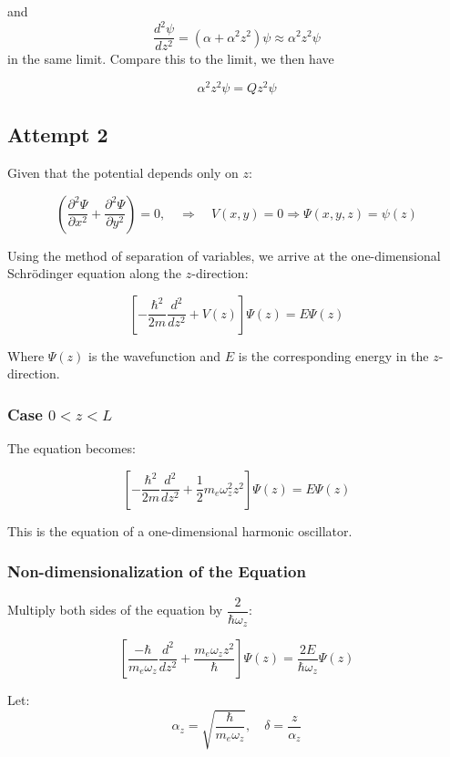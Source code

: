 and \begin{equation}
  \frac{d^2 \psi}{dz^2} = (\alpha + \alpha^2 z^2)\psi \approx \alpha^2 z^2 \psi 
\end{equation}
in the same limit. Compare this to the limit, we then have

\begin{equation}
  \alpha^2 z^2 \psi  = Qz^2 \psi
\end{equation}

\subsection{Attempt 2}

Given that the potential depends only on $z$:

\[
\left( \frac{\partial^2 \Psi}{\partial x^2} + \frac{\partial^2 \Psi}{\partial y^2} \right) = 0, \quad \Rightarrow \quad V(x, y) = 0 \Rightarrow \Psi(x, y, z) = \psi(z)
\]

Using the method of separation of variables, we arrive at the one-dimensional Schrödinger equation along the $z$-direction:

\[
\left[ -\frac{\hbar^2}{2m} \frac{d^2}{dz^2} + V(z) \right] \Psi(z) = E \Psi(z)
\]

Where $\Psi(z)$ is the wavefunction and $E$ is the corresponding energy in the $z$-direction.

\subsubsection{Case $0 < z < L$}

The equation becomes:

\[
\left[ -\frac{\hbar^2}{2m} \frac{d^2}{dz^2} + \frac{1}{2} m_e \omega_z^2 z^2 \right] \Psi(z) = E \Psi(z)
\]

This is the equation of a one-dimensional harmonic oscillator.

\subsubsection{Non-dimensionalization of the Equation}

Multiply both sides of the equation by $\dfrac{2}{\hbar \omega_z}$:

\[
\left[ \frac{-\hbar}{m_e \omega_z} \frac{d^2}{dz^2} + \frac{m_e \omega_z z^2}{\hbar} \right] \Psi(z) = \frac{2E}{\hbar \omega_z} \Psi(z)
\]

Let:
\[
\alpha_z = \sqrt{\frac{\hbar}{m_e \omega_z}}, \quad \delta = \frac{z}{\alpha_z}
\]

